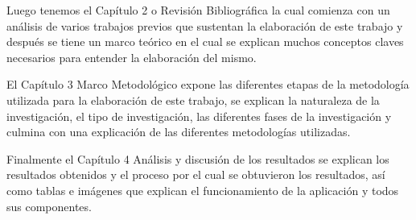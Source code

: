 Luego tenemos el Capítulo 2 o Revisión Bibliográfica la cual comienza con un
análisis de varios trabajos previos que sustentan la elaboración de este
trabajo y después se tiene un marco teórico en el cual se explican muchos
conceptos claves necesarios para entender la elaboración del mismo.

El Capítulo 3 Marco Metodológico expone las diferentes etapas de la metodología
utilizada para la elaboración de este trabajo, se explican la naturaleza de la
investigación, el tipo de investigación, las diferentes fases de la
investigación  y culmina con una explicación de las diferentes metodologías
utilizadas.

Finalmente el Capítulo 4 Análisis y discusión de los resultados se explican los
resultados obtenidos y el proceso por el cual se obtuvieron los resultados, así
como tablas e imágenes que explican el funcionamiento de la aplicación y todos
sus componentes.


